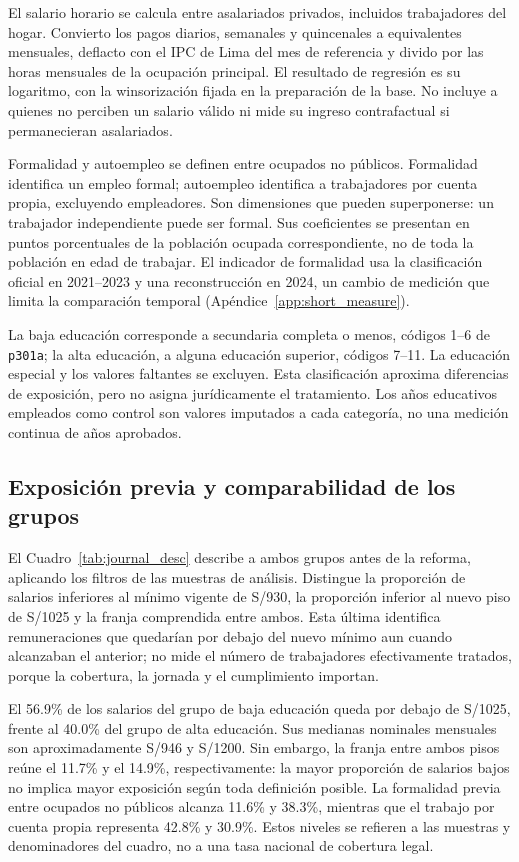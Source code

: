 El salario horario se calcula entre asalariados privados, incluidos trabajadores del hogar. Convierto los pagos diarios, semanales y quincenales a equivalentes mensuales, deflacto con el IPC de Lima del mes de referencia y divido por las horas mensuales de la ocupación principal. El resultado de regresión es su logaritmo, con la winsorización fijada en la preparación de la base. No incluye a quienes no perciben un salario válido ni mide su ingreso contrafactual si permanecieran asalariados.

Formalidad y autoempleo se definen entre ocupados no públicos. Formalidad identifica un empleo formal; autoempleo identifica a trabajadores por cuenta propia, excluyendo empleadores. Son dimensiones que pueden superponerse: un trabajador independiente puede ser formal. Sus coeficientes se presentan en puntos porcentuales de la población ocupada correspondiente, no de toda la población en edad de trabajar. El indicador de formalidad usa la clasificación oficial en 2021--2023 y una reconstrucción en 2024, un cambio de medición que limita la comparación temporal (Apéndice~\ref{app:short_measure}).

La baja educación corresponde a secundaria completa o menos, códigos 1--6 de \texttt{p301a}; la alta educación, a alguna educación superior, códigos 7--11. La educación especial y los valores faltantes se excluyen. Esta clasificación aproxima diferencias de exposición, pero no asigna jurídicamente el tratamiento. Los años educativos empleados como control son valores imputados a cada categoría, no una medición continua de años aprobados.

\subsection{Exposición previa y comparabilidad de los grupos}

El Cuadro~\ref{tab:journal_desc} describe a ambos grupos antes de la reforma, aplicando los filtros de las muestras de análisis. Distingue la proporción de salarios inferiores al mínimo vigente de S/930, la proporción inferior al nuevo piso de S/1025 y la franja comprendida entre ambos. Esta última identifica remuneraciones que quedarían por debajo del nuevo mínimo aun cuando alcanzaban el anterior; no mide el número de trabajadores efectivamente tratados, porque la cobertura, la jornada y el cumplimiento importan.



El 56.9\% de los salarios del grupo de baja educación queda por debajo de S/1025, frente al 40.0\% del grupo de alta educación. Sus medianas nominales mensuales son aproximadamente S/946 y S/1200. Sin embargo, la franja entre ambos pisos reúne el 11.7\% y el 14.9\%, respectivamente: la mayor proporción de salarios bajos no implica mayor exposición según toda definición posible. La formalidad previa entre ocupados no públicos alcanza 11.6\% y 38.3\%, mientras que el trabajo por cuenta propia representa 42.8\% y 30.9\%. Estos niveles se refieren a las muestras y denominadores del cuadro, no a una tasa nacional de cobertura legal.

